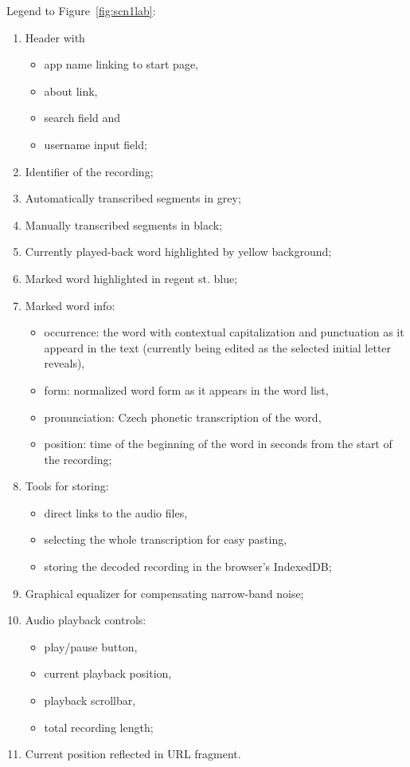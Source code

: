 \documentclass{svproc}
\begin{document}
Legend to Figure~\ref{fig:scn1lab}:
\begin{enumerate}
\item{
    Header with
    \begin{itemize}
    \item{app name linking to start page,}
    \item{about link,}
    \item{search field and}
    \item{username input field;}
    \end{itemize}
}
\item{Identifier of the recording;}
\item{Automatically transcribed segments in grey;}
\item{Manually transcribed segments in black;}
\item{Currently played-back word highlighted by yellow background;}
\item{Marked word highlighted in regent st. blue;}
\item{
    Marked word info:
    \begin{itemize}
    \item{
        occurrence: the word with contextual capitalization and
        punctuation as it appeard in the text (currently being edited as the
        selected initial letter reveals),
    }
    \item{form: normalized word form as it appears in the word list,}
    \item{pronunciation: Czech phonetic transcription of the word,}
    \item{
        position: time of the beginning of the word in seconds from the
        start of the recording;
    }
    \end{itemize}
}
\item{
    Tools for storing:
    \begin{itemize}
    \item{direct links to the audio files,}
    \item{selecting the whole transcription for easy pasting,}
    \item{storing the decoded recording in the browser's IndexedDB;}
    \end{itemize}
}
\item{Graphical equalizer for compensating narrow-band noise;}
\item{
    Audio playback controls:
    \begin{itemize}
    \item{play/pause button,}
    \item{current playback position,}
    \item{playback scrollbar,}
    \item{total recording length;}
    \end{itemize}
}
\item{Current position reflected in URL fragment.}
\end{enumerate}
\end{document}

